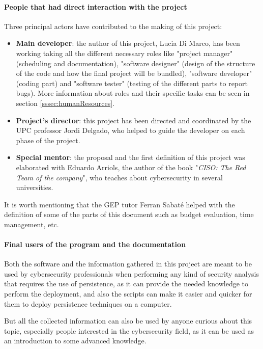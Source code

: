 \paragraph{People that had direct interaction with the project}
Three principal actors have contributed to the making of this project:
\begin{itemize}
\item \textbf{Main developer}: the author of this project, Lucia Di Marco, has been working taking all the different necessary roles like "project manager" (scheduling and documentation), "software designer" (design of the structure of the code and how the final project will be bundled), "software developer" (coding part) and "software tester" (testing of the different parts to report bugs). More information about roles and their specific tasks can be seen in section \ref{sssec:humanResources}.


\item \textbf{Project's director}: this project has been directed and coordinated by the UPC professor Jordi Delgado, who helped to guide the developer on each phase of the project.

\item \textbf{Special mentor}: the proposal and the first definition of this project was elaborated with Eduardo Arriols, the author of the book "\textit{CISO: The Red Team of the company}"\cite{RTBook}, who 
teaches about cybersecurity in several universities.

\end{itemize}

It is worth mentioning that the GEP tutor Ferran Sabaté helped with the definition of some of the parts of this document such as budget evaluation, time management, etc.

\paragraph{Final users of the program and the documentation}
Both the software and the information gathered in this project are meant to be used by cybersecurity professionals when performing any kind of security analysis that requires the use of persistence, as it can provide the needed knowledge to perform the deployment, and also the scripts can make it easier and quicker for them to deploy persistence techniques on a computer. 

But all the collected information can also be used by anyone curious about this topic, especially people interested in the cybersecurity field, as it can be used as an introduction to some advanced knowledge. 
